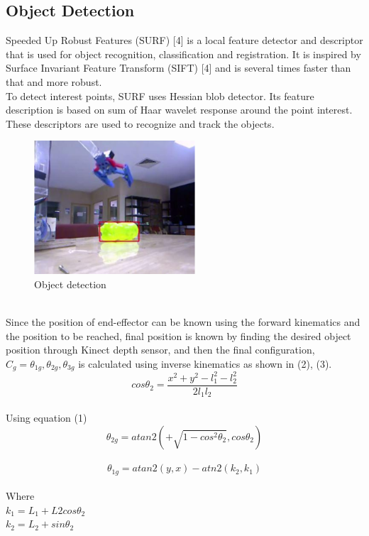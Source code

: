 \documentclass[conference]{IEEEtran}
\begin{document}
\subsection{Object Detection}
Speeded Up Robust Features (SURF) [4] is a local feature detector and descriptor that is used for object recognition, classification and registration. It is inspired by Surface Invariant Feature Transform (SIFT) [4] and is several times faster than that and more robust.\\
To detect interest points, SURF uses Hessian blob detector. Its feature description is based on sum of Haar wavelet response around the point interest. These descriptors are used to recognize and track the objects.\\
\begin{figure}[h]
\includegraphics[width=6cm]{objectdetection.png}
\centering
\caption{Object detection}\label{net_img}
\end{figure}\\
Since the position of end-effector can be known using the forward kinematics and the position to be reached, final position is known by finding the desired object position through Kinect depth sensor, and then the final configuration, $C_g={θ_{1g},θ_{2g},θ_{3g}}$ is calculated using inverse kinematics as shown in (2), (3).\\
\begin{equation} \label{eq:1}
cos\theta_2=\frac{x^2+y^2-l_1^2-l_2^2}{2l_1l_2}
\end{equation}\\
Using equation (1)\\
\begin{equation} \label{eq:2}
\theta_{2g}=atan2(+\sqrt{1-cos^2\theta_2},cos\theta_2)
\end{equation}\\

\begin{equation} \label{eq:3}
\theta_{1g}=atan2(y,x)-atn2(k_2,k_1)
\end{equation}\\
Where \\
$k_1=L_1+L2cos\theta_2$\\
$k_2=L_2+sin\theta_2$\\
\end{document}
